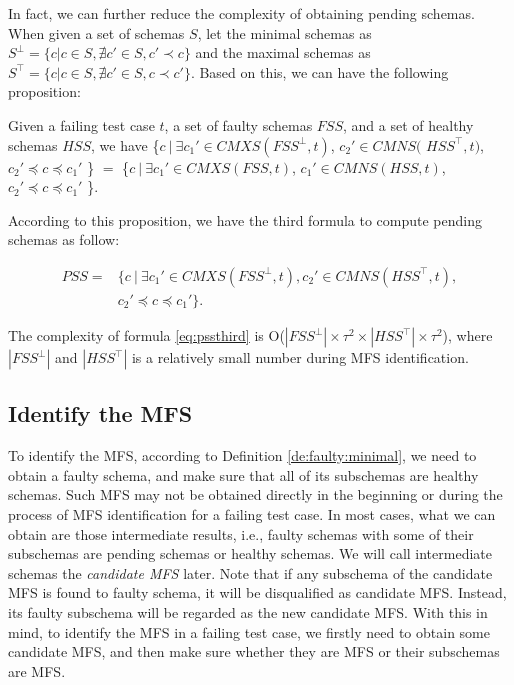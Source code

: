 \documentclass{sig-alternate-05-2015}
\begin{document}
{{In fact, we can further reduce the complexity of obtaining pending schemas. When given a set of schemas $S$, let the minimal schemas as $S^{\bot } = \{ c | c \in S, \nexists c' \in S, c' \prec c \}$ and the maximal schemas as $S^{\top } = \{ c | c \in S, \nexists c' \in S, c \prec c' \}$. Based on this, we can have the following proposition:

\begin{proposition}\label{pro:identicialPending}
Given a failing test case $t$, a set of faulty schemas $FSS$, and a set of healthy schemas $HSS$, we have \{$ c\ |\ \exists c_{1}' \in CMXS(FSS^{\bot}, t)$, $ c_{2}' \in CMNS($ $HSS^{\top}, t)$, $c_{2}' \preceq c \preceq c_{1}'$ \} $=$  \{$ c\ |\ \exists c_{1}' \in CMXS(FSS, t)$, $c_{1}' \in CMNS(HSS, t)$, $c_{2}' \preceq c \preceq c_{1}'$ \}.
\end{proposition}

According to this proposition, we have the third formula to compute pending schemas as follow:

\begin{equation}\label{eq:pssthird}
\begin{aligned}
PSS = & \{ c\ |\ \exists c_{1}' \in CMXS(FSS^{\bot}, t), c_{2}' \in CMNS(HSS^{\top}, t), \\
    & c_{2}' \preceq c \preceq c_{1}' \}.
\end{aligned}
\end{equation}

The complexity of formula \ref{eq:pssthird} is O($|FSS^{\bot}|\times \tau^{2} \times |HSS^{\top}|\times \tau^{2}$), where $|FSS^{\bot}|$ and $|HSS^{\top}|$ is a relatively small number during MFS identification.



\subsection{Identify the MFS}
To identify the MFS, according to Definition \ref{de:faulty:minimal}, we need to obtain a faulty schema, and make sure that all of its subschemas are healthy schemas. Such MFS may not be obtained directly in the beginning or during the process of MFS identification for a failing test case. In most cases, what we can obtain are those intermediate results, i.e., faulty schemas with some of their subschemas are pending schemas or healthy schemas. We will call intermediate schemas the \emph{candidate MFS} later. Note that if any subschema of the candidate MFS is found to faulty schema, it will be disqualified as candidate MFS. Instead, its faulty subschema will be regarded as the new candidate MFS. With this in mind, to identify the MFS in a failing test case, we firstly need to obtain some candidate MFS, and then make sure whether they are MFS or their subschemas are MFS.

}}
\end{document}
